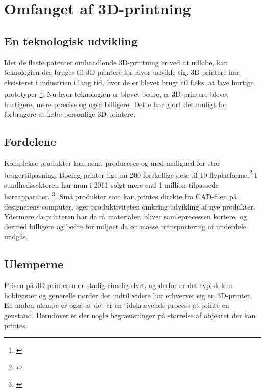 \chapter{Omfanget af 3D-printning} %
\label{cha:omfanget_af_3d_printer}

\section{En teknologisk udvikling} %
\label{par:en_teknologisk_udvikling}



Idet de fleste patenter omhandlende 3D-printning er ved at udløbe, kan teknologien der bruges til 3D-printere for alvor udvikle sig. 3D-printere har eksisteret i industrien i lang tid, hvor de er blevet brugt til f.eks. at lave hurtige prototyper \footnote{\cite[105]{manyika_disruptive_2013}}. Nu hvor teknologien er blevet bedre, er 3D-printere blevet hurtigere, mere præcise og også billigere. Dette har gjort det muligt for forbrugere at købe personlige 3D-printere. 


\section{Fordelene} %
\label{sec:fordelene}


Komplekse produkter kan nemt produceres og med mulighed for stor brugertilpasning. Boeing printer lige nu 200 forskellige dele til 10 flyplatforme.\footnote{\cite[108]{manyika_disruptive_2013}} I sundhedssektoren har man i 2011 solgt mere end 1 million tilpassede høreapparater. \footnote{\cite[108]{manyika_disruptive_2013}}. Små produkter som kan printes direkte fra CAD-filen på designerens computer, øger produktiviteten omkring udvikling af nye produkter. Ydermere da printeren har de rå materialer, bliver samleprocessen kortere, og dermed billigere og bedre for miljøet da en masse transportering af underdele undgås.


\section{Ulemperne} %
\label{par:ulemperne}


Prisen på 3D-printeren er stadig rimelig dyrt, og derfor er det typisk kun hobbyister og generelle nørder der indtil videre har erhvervet sig en 3D-printer. En anden ulempe er også at det er en tidskrævende process at printe en genstand. Derudover er der nogle begrænsninger på størrelse af objektet der kan printes.


